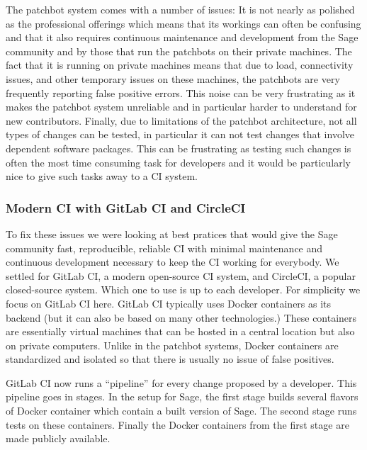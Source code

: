 \documentclass{deliverablereport}
\begin{document}
The patchbot system comes with a number of issues: It is not nearly as polished
as the professional offerings which means that its workings can often be
confusing and that it also requires continuous maintenance and development from
the Sage community and by those that run the patchbots on their private
machines. The fact that it is running on private machines means that due to
load, connectivity issues, and other temporary issues on these machines, the
patchbots are very frequently reporting false positive errors.
This noise can be very
frustrating as it makes the patchbot system unreliable and in particular harder
to understand for new contributors. Finally, due to limitations of the patchbot
architecture, not all types of changes can be tested, in particular it can not
test changes that involve dependent software packages. This can be frustrating
as testing such changes is often the most time consuming task for developers
and it would be particularly nice to give such tasks away to a CI system.

\subsubsection{Modern CI with GitLab CI and CircleCI}
To fix these issues we were looking at best pratices that would give the
Sage community fast, reproducible, reliable CI with minimal maintenance and
continuous development necessary to keep the CI working for everybody.  We
settled for GitLab CI, a modern open-source CI system, and CircleCI, a popular
closed-source system. Which one to use is up to each developer. For simplicity
we focus on GitLab CI here. GitLab CI typically uses Docker containers as its
backend (but it can also be based on many other technologies.) These containers
are essentially virtual machines that can be hosted in a central location but
also on private computers. Unlike in the patchbot systems, Docker containers
are standardized and isolated so that there is usually no issue of false
positives. %

GitLab CI now runs a ``pipeline'' for every change proposed by a developer.
This pipeline goes in stages. In the setup for Sage, the first stage builds
several flavors of Docker container which contain a built version of Sage. The
second stage runs tests on these containers. Finally the Docker containers from
the first stage are made publicly available.
\end{document}
